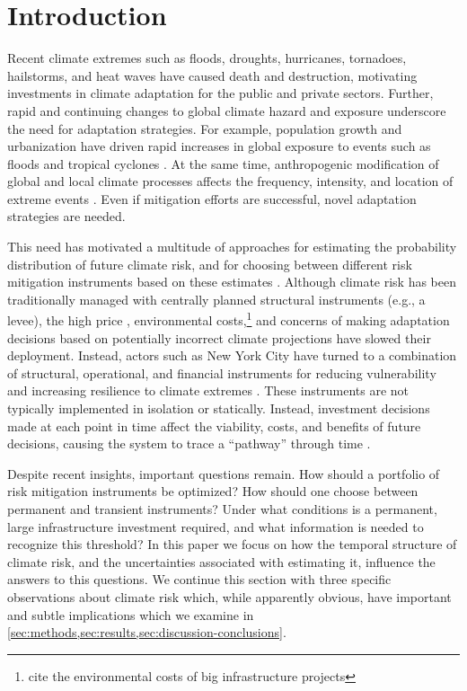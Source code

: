 \documentclass[
]{agujournal2018}
\makeatletter
\newcommand{\eg}{e.g.\@\xspace}
\makeatother
\begin{document}

\section{Introduction}\label{sec:introduction}

Recent climate extremes such as floods, droughts, hurricanes, tornadoes, hailstorms, and heat waves have caused death and destruction, motivating investments in climate adaptation for the public and private sectors.
Further, rapid and continuing changes to global climate hazard and exposure underscore the need for adaptation strategies.
For example, population growth and urbanization have driven rapid increases in global exposure to events such as floods \citep{Jongman:2012cr} and tropical cyclones \citep{Peduzzi:2012iq}.
At the same time, anthropogenic modification of global and local climate processes affects the frequency, intensity, and location of extreme events \citep{IPCC:2012wt, Milly:2008dg, Shaw:2016bo}.
Even if mitigation efforts are successful, novel adaptation strategies are needed.

This need has motivated a multitude of approaches for estimating the probability distribution of future climate risk, and for choosing between different risk mitigation instruments based on these estimates \citep[see, \eg,][]{Merz:2014gf}.
Although climate risk has been traditionally managed with centrally planned structural instruments (\eg, a levee), the high price \citep{Papakonstantinou:2016ve}, environmental costs,\footnote{cite the environmental costs of big infrastructure projects} and concerns of making adaptation decisions based on potentially incorrect climate projections \citep{lempert:2007} have slowed their deployment.
Instead, actors such as New York City have turned to a combination of structural, operational, and financial instruments for reducing vulnerability and increasing resilience to climate extremes \citep{CityofNewYork:2013uh}.
These instruments are not typically implemented in isolation or statically.
Instead, investment decisions made at each point in time affect the viability, costs, and benefits of future decisions, causing the system to trace a ``pathway'' through time \citep{Walker:2013gi,Haasnoot:2013im,Haasnoot:2015dh}.

Despite recent insights, important questions remain.
How should a portfolio of risk mitigation instruments be optimized?
How should one choose between permanent and transient instruments?
Under what conditions is a permanent, large infrastructure investment required, and what information is needed to recognize this threshold?
In this paper we focus on how the temporal structure of climate risk, and the uncertainties associated with estimating it, influence the answers to this questions.
We continue this section with three specific observations about climate risk which, while apparently obvious, have important and subtle implications which we examine in \cref{sec:methods,sec:results,sec:discussion-conclusions}.
\end{document}
